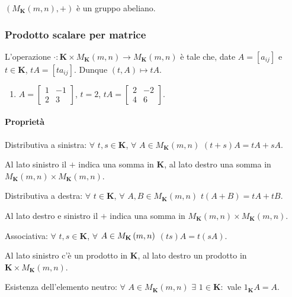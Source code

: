 \documentclass{article}
\begin{document}
$\left( M_{\mathbf{K}}\left( m,n\right) ,+\right) $ \`{e} un gruppo abeliano.

\subsubsection{Prodotto scalare per matrice}

L'operazione $\cdot :\mathbf{K}\times M_{\mathbf{K}}\left( m,n\right)
\rightarrow M_{\mathbf{K}}\left( m,n\right) $ \`{e} tale che, date $A=\left[
a_{ij}\right] $ e $t\in \mathbf{K}$, $tA=\left[ ta_{ij}\right] $. Dunque $%
\left( t,A\right) \mapsto tA$.

\begin{enumerate}
\item $A=\left[ 
\begin{array}{cc}
1 & -1 \\ 
2 & 3%
\end{array}%
\right] $, $t=2$, $tA=\left[ 
\begin{array}{cc}
2 & -2 \\ 
4 & 6%
\end{array}%
\right] $.
\end{enumerate}

\paragraph{Propriet\`{a}}

\begin{description}
\item[-] Distributiva a sinistra: $\forall $ $t,s\in \mathbf{K}$, $\forall $ 
$A\in M_{\mathbf{K}}\left( m,n\right) $ $\left( t+s\right) A=tA+sA$.

\item Al lato sinistro il $+$ indica una somma in $\mathbf{K}$, al lato
destro una somma in $M_{\mathbf{K}}\left( m,n\right) \times M_{\mathbf{K}%
}\left( m,n\right) $.

\item[-] Distributiva a destra: $\forall $ $t\in \mathbf{K}$, $\forall $ $%
A,B\in M_{\mathbf{K}}\left( m,n\right) $ $t\left( A+B\right) =tA+tB$.

\item Al lato destro e sinistro il $+$ indica una somma in $M_{\mathbf{K}%
}\left( m,n\right) \times M_{\mathbf{K}}\left( m,n\right) $.

\item[-] Associativa: $\forall $ $t,s\in \mathbf{K}$, $\forall $ $A\in M_{%
\mathbf{K}}\left( m,n\right) $ $\left( ts\right) A=t\left( sA\right) $.

\item Al lato sinistro c'\`{e} un prodotto in $\mathbf{K}$, al lato destro
un prodotto in $\mathbf{K}\times M_{\mathbf{K}}\left( m,n\right) $.

\item[-] Esistenza dell'elemento neutro: $\forall $ $A\in M_{\mathbf{K}%
}\left( m,n\right) $ $\exists $ $1\in \mathbf{K}:$ vale $1_{\mathbf{K}}A=A$.
\end{description}
\end{document}
